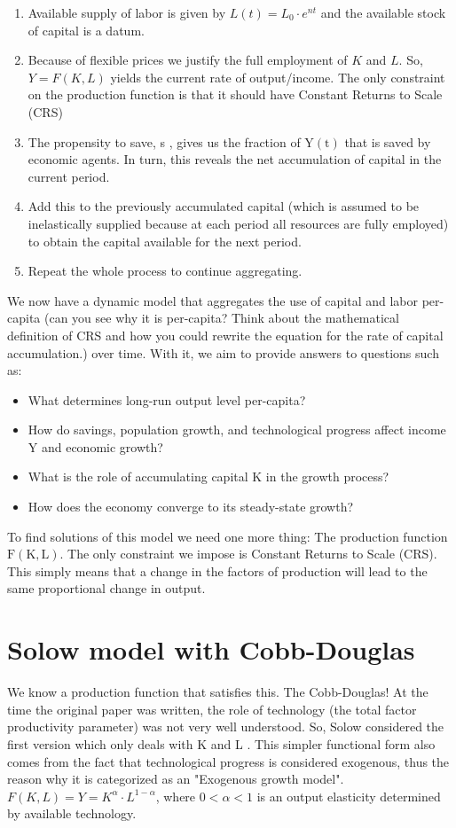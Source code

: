 \documentclass[10pt]{article}
\begin{document}
\begin{enumerate}
  \item Available supply of labor is given by $L(t)=L_{0} \cdot e^{n t}$ and the available stock of capital is a datum.
  \item Because of flexible prices we justify the full employment of $K$ and $L$. So, $Y=F(K, L)$ yields the current rate of output/income. The only constraint on the production function is that it should have Constant Returns to Scale (CRS)
  \item The propensity to save, s , gives us the fraction of $\mathrm{Y}(\mathrm{t})$ that is saved by economic agents. In turn, this reveals the net accumulation of capital in the current period.
  \item Add this to the previously accumulated capital (which is assumed to be inelastically supplied because at each period all resources are fully employed) to obtain the capital available for the next period.
  \item Repeat the whole process to continue aggregating.
\end{enumerate}

We now have a dynamic model that aggregates the use of capital and labor per-capita (can you see why it is per-capita? Think about the mathematical definition of CRS and how you could rewrite the equation for the rate of capital accumulation.) over time. With it, we aim to provide answers to questions such as:

\begin{itemize}
  \item What determines long-run output level per-capita?
  \item How do savings, population growth, and technological progress affect income Y and economic growth?
  \item What is the role of accumulating capital K in the growth process?
  \item How does the economy converge to its steady-state growth?
\end{itemize}

To find solutions of this model we need one more thing: The production function $\mathrm{F}(\mathrm{K}, \mathrm{L})$. The only constraint we impose is Constant Returns to Scale (CRS). This simply means that a change in the factors of production will lead to the same proportional change in output.

\section*{Solow model with Cobb-Douglas}
We know a production function that satisfies this. The Cobb-Douglas! At the time the original paper was written, the role of technology (the total factor productivity parameter) was not very well understood. So, Solow considered the first version which only deals with K and L . This simpler functional form also comes from the fact that technological progress is considered exogenous, thus the reason why it is categorized as an "Exogenous growth model".\\
$F(K, L)=Y=K^{\alpha} \cdot L^{1-\alpha}$, where $0<\alpha<1$ is an output elasticity determined by available technology.
\end{document}

